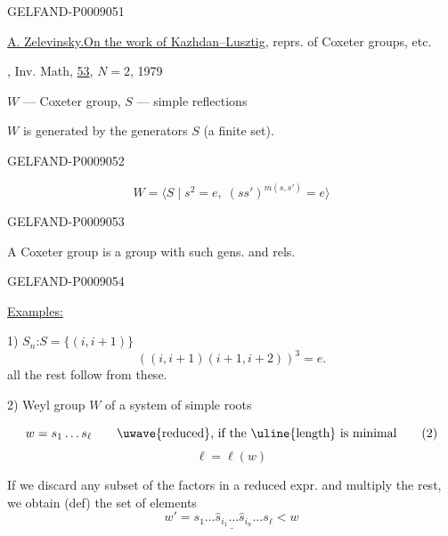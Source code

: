 \begin{GelfandAdjacentEvidence}{GELFAND-P000905}{1}

\qquad{}

\uline{A. Zelevinsky.}\qquad\uline{On the work of Kazhdan–Lusztig}, reprs. of Coxeter groups, etc.

, Inv. Math, \uline{53}, $N=2$, 1979

$W$ --- Coxeter group, $S$ --- simple reflections

$W$ is generated by the generators $S$ (a finite set).
\end{GelfandAdjacentEvidence}
\begin{GelfandAdjacentEvidence}{GELFAND-P000905}{2}


\begin{equation*}
W=\langle S\mid s^2=e,\;(ss')^{m(s,s')}=e\rangle
\tag{1}
\end{equation*}
\end{GelfandAdjacentEvidence}
\begin{GelfandAdjacentEvidence}{GELFAND-P000905}{3}


A Coxeter group is a group with such gens. and rels.
\end{GelfandAdjacentEvidence}
\begin{GelfandAdjacentEvidence}{GELFAND-P000905}{4}


\uline{Examples:}

1) $S_n$:\qquad $S=\{(i,i+1)\}$
\[
((i,i+1)(i+1,i+2))^3=e.
\]
all the rest follow from these.

2) Weyl group $W$ of a system of simple roots

\begin{equation*}
w=s_1\ldots s_\ell
\qquad
\text{\uwave{reduced}, if the \uline{length} is minimal}
\tag{2}
\end{equation*}
\[
\ell=\ell(w)
\]

If we discard any subset of the factors in a reduced expr. and multiply the rest, we obtain (def) the set of elements 
\begin{equation*}
\underline{w'=s_1\ldots\hat s_{i_1}\ldots
\hat s_{i_n}\ldots s_\ell<w}
\tag{3}
\end{equation*}
\end{GelfandAdjacentEvidence}
